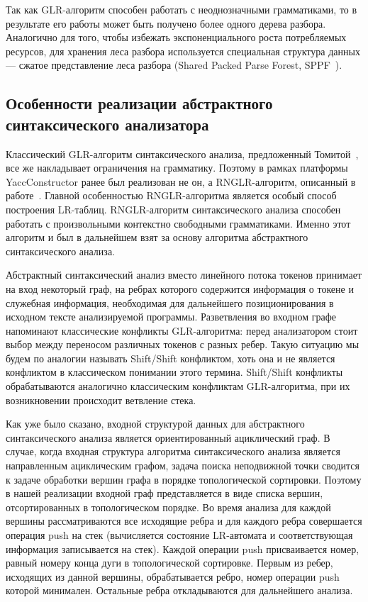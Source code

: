 \documentclass{matmex-diploma}
\begin{document}
Так как GLR-алгоритм способен работать с неоднозначными грамматиками, то в результате 
его работы может быть получено более одного дерева разбора. Аналогично для того, 
чтобы избежать экспоненциального роста потребляемых ресурсов, для хранения леса 
разбора используется специальная структура данных — сжатое представление леса разбора 
(Shared Packed Parse Forest, SPPF~\cite{rekers1992parser}). 

\subsection{Особенности реализации абстрактного синтаксического анализатора}
Классический GLR-алгоритм синтаксического анализа, предложенный Томитой~\cite{Tomita:1984:LPN:980431.980564, Tomita:1985:ECP:1623611.1623625, Tomita:1985:EPN:537456}, 
все же накладывает ограничения на грамматику. Поэтому в рамках платформы YaccConstructor 
ранее был реализован не он, а RNGLR-алгоритм, описанный в работе~\cite{Scott:2006:RNG:1146809.1146810}. Главной 
особенностью RNGLR-алгоритма является особый способ построения LR-таблиц. 
RNGLR-алгоритм синтаксического анализа способен работать с произвольными контекстно 
свободными грамматиками. Именно этот алгоритм и был в дальнейшем взят за основу 
алгоритма абстрактного синтаксического анализа. 

Абстрактный синтаксический анализ вместо линейного потока токенов принимает на 
вход некоторый граф, на ребрах которого содержится информация о токене и служебная 
информация, необходимая для дальнейшего позиционирования в исходном тексте 
анализируемой программы. Разветвления во входном графе напоминают классические 
конфликты GLR-алгоритма: перед анализатором стоит выбор между переносом различных 
токенов с разных ребер. Такую ситуацию мы будем по аналогии называть Shift/Shift 
конфликтом, хоть она и не является конфликтом в классическом понимании этого термина. 
Shift/Shift конфликты обрабатываются аналогично классическим конфликтам GLR-алгоритма, 
при их возникновении происходит ветвление стека.

Как уже было сказано, входной структурой данных для абстрактного синтаксического 
анализа является ориентированный ациклический граф. В случае, когда входная структура 
алгоритма синтаксического анализа является направленным ациклическим графом, задача 
поиска неподвижной точки сводится к задаче обработки вершин графа в порядке 
топологической сортировки. Поэтому в нашей реализации входной граф представляется 
в виде списка вершин, отсортированных в топологическом порядке. Во время анализа 
для каждой вершины рассматриваются все исходящие ребра и для каждого ребра 
совершается операция push на стек (вычисляется состояние LR-автомата и соответствующая 
информация записывается на стек). Каждой операции push присваивается номер, равный
номеру конца дуги в топологической сортировке. Первым из ребер, исходящих из данной 
вершины, обрабатывается ребро, номер операции push которой минимален. Остальные 
ребра откладываются для дальнейшего анализа. 
\end{document}
